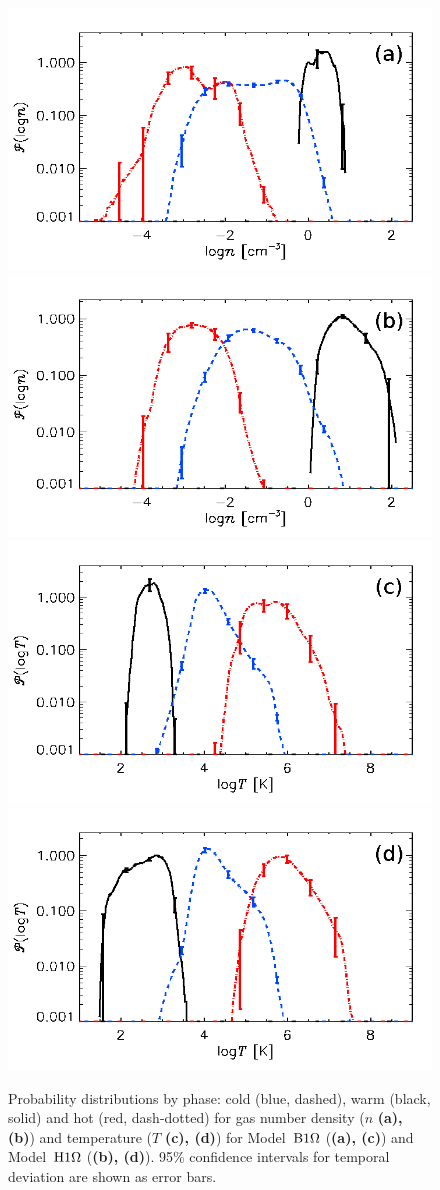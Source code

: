 \documentclass[useAMS,usenatbib]{mn2e}
\begin{document}
  \begin{figure}
  \centering
  \includegraphics[width=0.45\linewidth]{fig/o1pr_npdf3s.png}  
  \includegraphics[width=0.45\linewidth]{fig/o1ph_npdf3s.png}\\  
  \includegraphics[width=0.45\linewidth]{fig/o1pr_tpdf3s.png}
  \includegraphics[width=0.45\linewidth]{fig/o1ph_tpdf3s.png}  
    \caption[Probability distributions by phase for $n$ and $T$]{
  Probability distributions by phase: cold (blue, dashed), warm (black, solid)
  and hot (red, dash-dotted) for gas number density ($n$ {\textbf{(a), (b)}})
  and temperature ($T$ {\textbf{(c), (d)}}) 
  for Model~${\mathrm{B}1\rm{\Omega} }$ ({\textbf{(a), (c)}}) and Model~${\mathrm{H}1\rm{\Omega}}$
  ({\textbf{(b), (d)}}).
  95\% confidence intervals for temporal deviation are shown as error bars.   
  \label{fig:npdf3s}
    }
  \end{figure}
\end{document}

